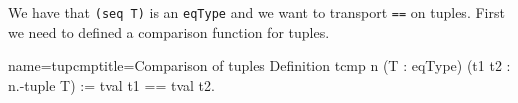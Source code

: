 % 
% 
% 
% 

\label{sec:subtypekit}

We have that \lstinline/(seq T)/ is an \lstinline/eqType/ and
we want to transport \lstinline/==/ on tuples.  First we need to
defined a comparison function for tuples.

\begin{coq}{name=tupcmp}{title=Comparison of tuples}
Definition tcmp n (T : eqType) (t1 t2 : n.-tuple T) :=
  tval t1 == tval t2.
\end{coq}

